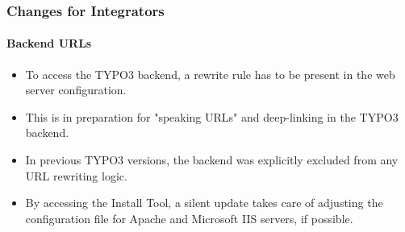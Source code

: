 %

\begin{frame}[fragile]
	\frametitle{Changes for Integrators}
	\framesubtitle{Backend URLs}

	\begin{itemize}

		\item To access the TYPO3 backend, a rewrite rule has to be present in
			the web server configuration.
		\item This is in preparation for "speaking URLs" and deep-linking in the
			TYPO3 backend.
		\item In previous TYPO3 versions, the backend was explicitly excluded
			from any URL rewriting logic.
		\item By accessing the Install Tool, a silent update takes care of
			adjusting the configuration file for Apache and Microsoft IIS
			servers, if possible.

	\end{itemize}
\end{frame}

